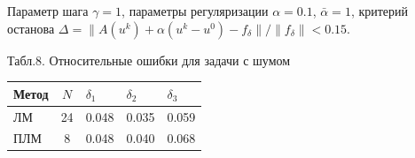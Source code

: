 \documentclass[10pt,pdf, mathserif, hyperref={unicode}]{beamer}
\begin{document}
\begin{frame}{}
	Параметр шага $\gamma=1$, параметры регуляризации $\alpha=0.1$, $\bar{\alpha}=1$, критерий останова $\Delta=\|A(u^k)+\alpha(u^k-u^0)-f_\delta\|/\|f_\delta\|<0.15$.
	\begin{table}[H]
		\centering
		{\scriptsize Табл.8. Относительные ошибки для задачи с шумом}
		\begin{tabular}{|l|c|l|l|l|}
			\hline
			\textbf{Метод} & \textbf{$N$} & \textbf{$\delta_1$} & \textbf{$\delta_2$} & \textbf{$\delta_3$} \\ \hline
			ЛМ                                                    & 24                            & 0.048                                & 0.035                                & 0.059                                \\ \hline
			ПЛМ                                                   & 8                             & 0.048                                & 0.040                                & 0.068                                \\ \hline
		\end{tabular}
	\end{table}
\end{frame}
\end{document}
